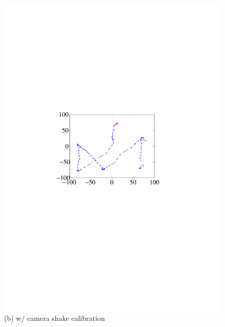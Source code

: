 \begin{figure}[!t]
{\begin{minipage}[b]{0.24\textwidth}
            \includegraphics[width=\textwidth]{fig/5-2.pdf}\\
            \centering  (b) w/ camera shake calibration
            \end{minipage}
        }
        \hfill
\end{figure}
